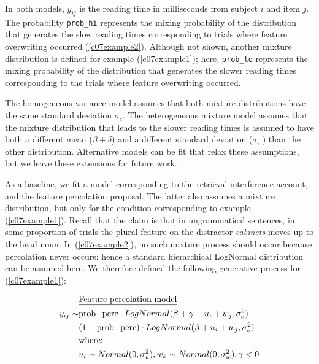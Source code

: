 \documentclass{cambridge7A}\usepackage[]{graphicx}\usepackage[]{color}
\begin{document}
\noindent
In both models, 
$y_{ij}$ 
is the reading time in milliseconds from subject $i$ and item $j$.  The probability  \texttt{prob\_hi} represents the mixing probability of the distribution that generates the slow reading times corresponding to trials where feature overwriting occurred (\ref{c07example2}). Although not shown, another mixture distribution is defined for example (\ref{c07example1}); here, 
\texttt{prob\_lo} represents the mixing probability of the distribution that generates the slower reading times corresponding to the trials where feature overwriting occurred. 

The homogeneous variance model assumes that both mixture distributions have the same standard deviation $\sigma_e$.  The heterogeneous mixture model assumes that the mixture distribution that leads to the slower reading times is assumed to have both a different mean ($\beta+\delta$) and a different standard deviation ($\sigma_{e'}$) than the other distribution.
Alternative models can be fit that relax these assumptions, but we leave these extensions for future work.


As a baseline, we fit a model corresponding to the retrieval interference account,  and the 
feature percolation proposal. The latter also assumes a mixture distribution, but only for the condition corresponding to  example (\ref{c07example1}). Recall that the claim is that in ungrammatical sentences, in some proportion of trials the plural feature on the distractor \textit{cabinets} moves up to the head noun. In (\ref{c07example2}), no such mixture process should occur because percolation never occurs; hence a standard hierarchical LogNormal distribution can be assumed here. We therefore defined the following generative process for (\ref{c07example1}):

\begin{equation}
\begin{split}
       ~&\hbox{\underline{Feature percolation model}}\\
y_{ij} \sim& \hbox{prob\_perc} \cdot LogNormal(\beta+\gamma+u_i+w_j,\sigma_{e}^2)+\\
           ~& (1-\hbox{prob\_perc}) \cdot LogNormal(\beta+u_i+w_j,\sigma_e^2)\\
           ~& \hbox{where: }\\
           ~& u_i \sim Normal(0,\sigma_u^2), w_k \sim Normal(0,\sigma_w^2), \gamma < 0 \\ 
\end{split}
\end{equation}
\end{document}
